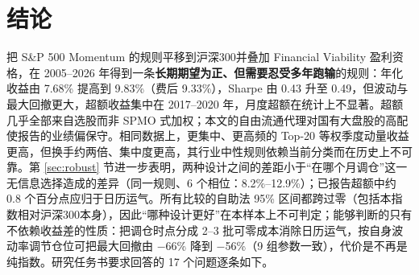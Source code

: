 \documentclass[11pt,a4paper]{article}
\begin{document}
\section{结论}\label{sec:conclusion}
把 S\&P 500 Momentum 的规则平移到沪深300并叠加 Financial Viability 盈利资格，在 2005--2026 年得到一条\textbf{长期期望为正、但需要忍受多年跑输}的规则：年化收益由 7.68\% 提高到 9.83\%（费后 9.33\%），Sharpe 由 0.43 升至 0.49，但波动与最大回撤更大，超额收益集中在 2017--2020 年，月度超额在统计上不显著。超额几乎全部来自选股而非 SPMO 式加权；本文的自由流通代理对国有大盘股的高配使报告的业绩偏保守。相同数据上，更集中、更高频的 Top-20 等权季度动量收益更高，但换手约两倍、集中度更高，其行业中性规则依赖当前分类而在历史上不可靠。第 \ref{sec:robust} 节进一步表明，两种设计之间的差距小于“在哪个月调仓”这一无信息选择造成的差异（同一规则、6 个相位：8.2\%--12.9\%）；已报告超额中约 0.8 个百分点应归于日历运气。所有比较的自助法 95\% 区间都跨过零（包括本指数相对沪深300本身），因此“哪种设计更好”在本样本上不可判定；能够判断的只有不依赖收益差的性质：把调仓时点分成 2--3 批可零成本消除日历运气，按自身波动率调节仓位可把最大回撤由 $-$66\% 降到 $-$56\%（9 组参数一致），代价是不再是纯指数。研究任务书要求回答的 17 个问题逐条如下。
\end{document}
